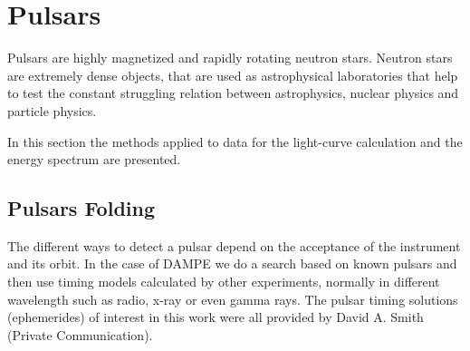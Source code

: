 \documentclass{PoS}
\begin{document}



\section{Pulsars}

Pulsars are highly magnetized and rapidly rotating neutron stars. Neutron stars are  extremely dense objects, that  are used as  astrophysical laboratories that help to test the constant struggling relation between astrophysics, nuclear physics  and particle physics. %

In this section the methods applied  to data for the light-curve calculation and the energy spectrum are presented.



\subsection{Pulsars Folding}
The different ways to detect a pulsar depend on the acceptance of the instrument and its orbit. In the case of DAMPE we do a search based on known pulsars and  then use timing models calculated by other experiments, normally in different wavelength such as radio, x-ray or even gamma  rays. The pulsar timing solutions (ephemerides) of interest in this work were all provided by David A. Smith (Private Communication).

\end{document}
